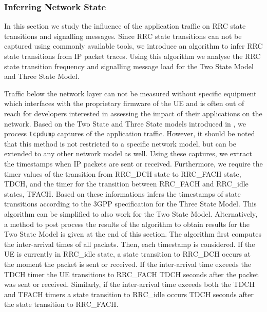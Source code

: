 \subsubsection*{Inferring Network State}\label{sec:network:network_traces:performance_evaluation:inferring_network_state}
In this section we study the influence of the application traffic on \gls{RRC} state transitions and signalling messages.
Since \gls{RRC} state transitions can not be captured using commonly available tools, we introduce an algorithm to infer \gls{RRC} state transitions from \gls{IP} packet traces.
Using this algorithm we analyse the \gls{RRC} state transition frequency and signalling message load for the Two State Model and Three State Model.

Traffic below the network layer can not be measured without specific equipment which interfaces with the proprietary firmware of the \gls{UE} and is often out of reach for developers interested in assessing the impact of their applications on the network.
Based on the Two State and Three State models introduced in , we process \texttt{tcpdump} captures of the application traffic.
However, it should be noted that this method is not restricted to a specific network model, but can be extended to any other network model as well.
Using these captures, we extract the timestamps when \gls{IP} packets are sent or received.
Furthermore, we require the timer values of the transition from \gls{RRC_DCH} state to \gls{RRC_FACH} state, \gls{TDCH}, and the timer for the transition between \gls{RRC_FACH} and \gls{RRC_idle} states, \gls{TFACH}.
Based on these informations  infers the timestamps of state transitions according to the \gls{3GPP} specification \cite{3GPP_RRC_Spec} for the Three State Model.
This algorithm can be simplified to also work for the Two State Model. 
Alternatively, a method to post process the results of the algorithm to obtain results for the Two State Model is given at the end of this section.
The algorithm first computes the inter-arrival times of all packets.
Then, each timestamp is considered.
If the \gls{UE} is currently in \gls{RRC_idle} state, a state transition to \gls{RRC_DCH} occurs at the moment the packet is sent or received.
If the inter-arrival time exceeds the \gls{TDCH} timer the \gls{UE} transitions to \gls{RRC_FACH} \gls{TDCH} seconds after the packet was sent or received.
Similarly, if the inter-arrival time exceeds both the \gls{TDCH} and \gls{TFACH} timers a state transition to \gls{RRC_idle} occurs \gls{TDCH} seconds after the state transition to \gls{RRC_FACH}.

